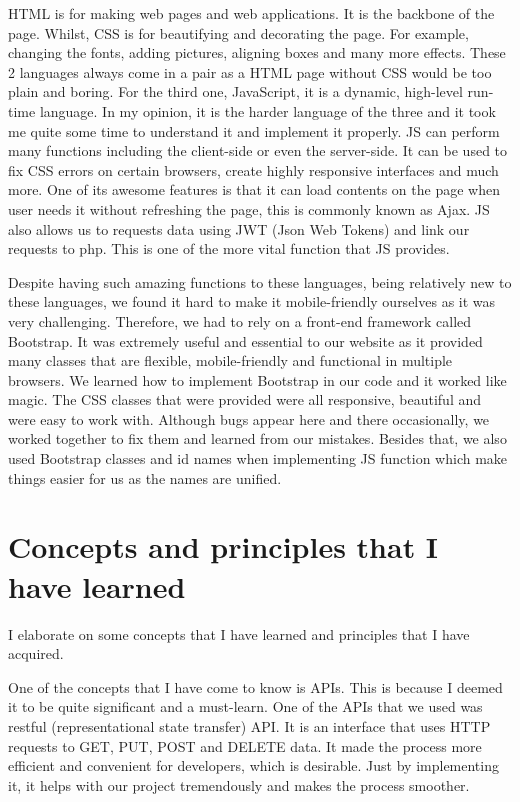 \documentclass[a4paper]{article}
\begin{document}
HTML is for making web pages and web applications. It is the backbone of the page. Whilst, CSS is for beautifying and decorating the page. For example, changing the fonts, adding pictures, aligning boxes and many more effects. These 2 languages always come in a pair as a HTML page without CSS would be too plain and boring. For the third one, JavaScript, it is a dynamic, high-level run-time language. In my opinion, it is the harder language of the three and it took me quite some time to understand it and implement it properly. JS can perform many functions including the client-side or even the server-side. It can be used to fix CSS errors on certain browsers, create highly responsive interfaces and much more. One of its awesome features is that it can load contents on the page when user needs it without refreshing the page, this is commonly known as Ajax. JS also allows us to requests data using JWT (Json Web Tokens) and link our requests to php. This is one of the more vital function that JS provides.
\newline

Despite having such amazing functions to these languages, being relatively new to these languages, we found it hard to make it mobile-friendly ourselves as it was very challenging. Therefore, we had to rely on a front-end framework called Bootstrap. It was extremely useful and essential to our website as it provided many classes that are flexible, mobile-friendly and functional in multiple browsers. We learned how to implement Bootstrap in our code and it worked like magic. The CSS classes that were provided were all responsive, beautiful and were easy to work with. Although bugs appear here and there occasionally, we worked together to fix them and learned from our mistakes. Besides that, we also used Bootstrap classes and id names when implementing JS function which make things easier for us as the names are unified.
\newline

\section{Concepts and principles that I have learned}\newline
I elaborate on some concepts that I have learned and principles that I have acquired.
\newline

One of the concepts that I have come to know is APIs. This is because I deemed it to be quite significant and a must-learn. One of the APIs that we used was restful (representational state transfer) API. It is an interface that uses HTTP requests to GET, PUT, POST and DELETE data. It made the process more efficient and convenient for developers, which is desirable. Just by implementing it, it helps with our project tremendously and makes the process smoother.
\newline
\end{document}
